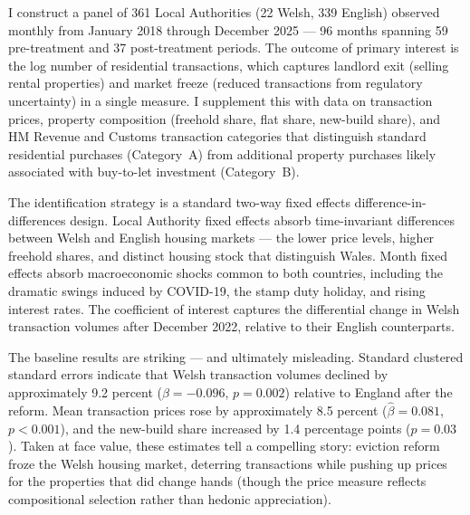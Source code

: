 \documentclass[12pt]{article}
\begin{document}
I construct a panel of 361 Local Authorities (22 Welsh, 339 English) observed monthly from January 2018 through December 2025 --- 96 months spanning 59 pre-treatment and 37 post-treatment periods. The outcome of primary interest is the log number of residential transactions, which captures landlord exit (selling rental properties) and market freeze (reduced transactions from regulatory uncertainty) in a single measure. I supplement this with data on transaction prices, property composition (freehold share, flat share, new-build share), and HM Revenue and Customs transaction categories that distinguish standard residential purchases (Category~A) from additional property purchases likely associated with buy-to-let investment (Category~B).

The identification strategy is a standard two-way fixed effects difference-in-differences design. Local Authority fixed effects absorb time-invariant differences between Welsh and English housing markets --- the lower price levels, higher freehold shares, and distinct housing stock that distinguish Wales. Month fixed effects absorb macroeconomic shocks common to both countries, including the dramatic swings induced by COVID-19, the stamp duty holiday, and rising interest rates. The coefficient of interest captures the differential change in Welsh transaction volumes after December 2022, relative to their English counterparts.

The baseline results are striking --- and ultimately misleading. Standard clustered standard errors indicate that Welsh transaction volumes declined by approximately 9.2 percent ($\hat{\beta} = -0.096$, $p = 0.002$) relative to England after the reform. Mean transaction prices rose by approximately 8.5 percent ($\hat{\beta} = 0.081$, $p < 0.001$), and the new-build share increased by 1.4 percentage points ($p = 0.03$). Taken at face value, these estimates tell a compelling story: eviction reform froze the Welsh housing market, deterring transactions while pushing up prices for the properties that did change hands (though the price measure reflects compositional selection rather than hedonic appreciation).
\end{document}
